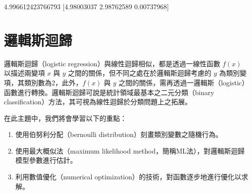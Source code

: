 \documentclass[letterpaper,10pt,english]{sphinxmanual}
\begin{document}
\begin{sphinxVerbatim}[commandchars=\\\{\}]
  
 
\end{sphinxVerbatim}

\begin{sphinxVerbatim}[commandchars=\\\{\}]
4.996612423766793
[\PYGZhy{}4.98003037  2.98762589 \PYGZhy{}0.00737968]
\end{sphinxVerbatim}


\chapter{邏輯斯迴歸}
\label{\detokenize{notebook/logistic-regression:id1}}\label{\detokenize{notebook/logistic-regression::doc}}
邏輯斯迴歸（logistic regression）與線性迴歸相似，都是透過一線性函數 \(f(x)\) 以描述兩變項 \(x\) 與 \(y\) 之間的關係，但不同之處在於邏輯斯迴歸考慮的 \(y\) 為類別變項，其類別數為2，此外，\(f(x)\) 與 \(y\) 之間的關係，需再透過一邏輯斯（logistic）函數進行轉換。邏輯斯迴歸可說是統計領域最基本之二元分類（binary classification）方法，其可視為線性迴歸於分類問題上之拓展。

在此主題中，我們將會學習以下的重點：
\begin{enumerate}
%
\item {} 
使用伯努利分配（bernoulli distribution）刻畫類別變數之隨機行為。

\item {} 
使用最大概似法（maximum likelihood method，簡稱ML法），對邏輯斯迴歸模型參數進行估計。

\item {} 
利用數值優化（numerical optimization）的技術，對函數逐步地進行優化以求解。

\end{enumerate}
\end{document}
